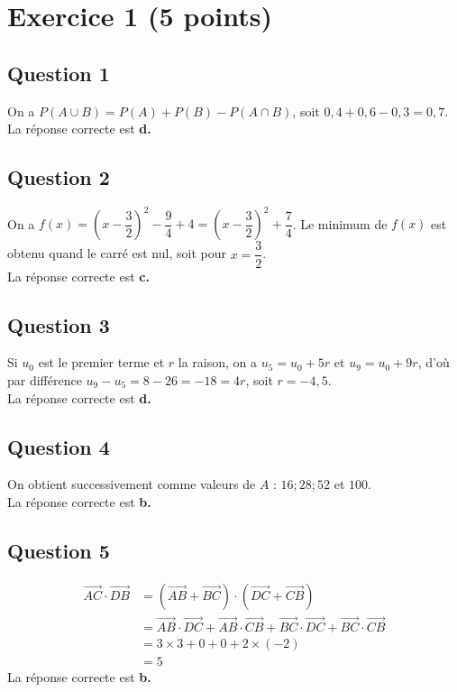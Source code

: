\section*{Exercice 1 (5 points)}
	
	
\subsection*{Question 1}
On a $P(A \cup B) = P(A) + P(B) - P(A \cap B)$, soit $0,4 + 0,6 - 0,3 = 0,7$.\\ La réponse correcte est \textbf{d.}
	
\subsection*{Question 2}
On a $f(x) = \left(x - \dfrac{3}{2}\right)^2 - \dfrac{9}{4} + 4 = \left(x - \dfrac{3}{2}\right)^2 + \dfrac{7}{4}$. Le minimum de $f(x)$ est obtenu quand le carré est nul, soit pour $x = \dfrac{3}{2}$.\\ La réponse correcte est \textbf{c.}
	
\subsection*{Question 3}
Si $u_0$ est le premier terme et $r$ la raison, on a $u_5 = u_0 + 5r$ et $u_9 = u_0 + 9r$, d’où par différence $u_9 - u_5 = 8 - 26 = -18 = 4r$, soit $r = -4,5$. \\La réponse correcte est \textbf{d.}
	
\subsection*{Question 4}
On obtient successivement comme valeurs de $A$ : $16 ; 28 ; 52$ et $100$.\\
 La réponse correcte est \textbf{b.}
	
\subsection*{Question 5}
\begin{align*}
	\overrightarrow{AC} \cdot \overrightarrow{DB} &= \left(\overrightarrow{AB} + \overrightarrow{BC}\right) \cdot \left(\overrightarrow{DC} + \overrightarrow{CB}\right)\\
	& = \overrightarrow{AB} \cdot \overrightarrow{DC} + \overrightarrow{AB} \cdot \overrightarrow{CB} + \overrightarrow{BC} \cdot \overrightarrow{DC} + \overrightarrow{BC} \cdot \overrightarrow{CB}\\
	& = 3 \times 3 + 0 + 0 + 2 \times (-2)\\
	& = 5
\end{align*}
La réponse correcte est \textbf{b.}
